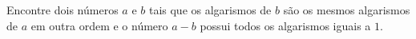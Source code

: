 Encontre dois números $a$ e $b$ tais que os algarismos de $b$ são os mesmos algarismos de $a$ em outra ordem e o número $a - b$ possui todos os algarismos iguais a $1$.
